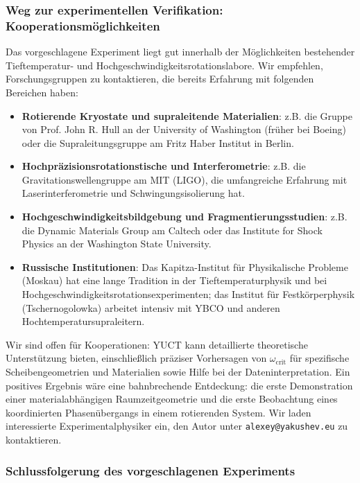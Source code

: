 \documentclass[12pt,a4paper]{article}
\begin{document}
	\subsubsection{Weg zur experimentellen Verifikation: Kooperationsmöglichkeiten}
	
	Das vorgeschlagene Experiment liegt gut innerhalb der Möglichkeiten bestehender Tieftemperatur- und Hochgeschwindigkeitsrotationslabore. Wir empfehlen, Forschungsgruppen zu kontaktieren, die bereits Erfahrung mit folgenden Bereichen haben:
	
	\begin{itemize}
		\item \textbf{Rotierende Kryostate und supraleitende Materialien}: z.B. die Gruppe von Prof. John R. Hull an der University of Washington (früher bei Boeing) oder die Supraleitungsgruppe am Fritz Haber Institut in Berlin.
		\item \textbf{Hochpräzisionsrotationstische und Interferometrie}: z.B. die Gravitationswellengruppe am MIT (LIGO), die umfangreiche Erfahrung mit Laserinterferometrie und Schwingungsisolierung hat.
		\item \textbf{Hochgeschwindigkeitsbildgebung und Fragmentierungsstudien}: z.B. die Dynamic Materials Group am Caltech oder das Institute for Shock Physics an der Washington State University.
		\item \textbf{Russische Institutionen}: Das Kapitza-Institut für Physikalische Probleme (Moskau) hat eine lange Tradition in der Tieftemperaturphysik und bei Hochgeschwindigkeitsrotationsexperimenten; das Institut für Festkörperphysik (Tschernogolowka) arbeitet intensiv mit YBCO und anderen Hochtemperatursupraleitern.
	\end{itemize}
	
	Wir sind offen für Kooperationen: YUCT kann detaillierte theoretische Unterstützung bieten, einschließlich präziser Vorhersagen von \(\omega_{\text{crit}}\) für spezifische Scheibengeometrien und Materialien sowie Hilfe bei der Dateninterpretation. Ein positives Ergebnis wäre eine bahnbrechende Entdeckung: die erste Demonstration einer materialabhängigen Raumzeitgeometrie und die erste Beobachtung eines koordinierten Phasenübergangs in einem rotierenden System. Wir laden interessierte Experimentalphysiker ein, den Autor unter \texttt{alexey@yakushev.eu} zu kontaktieren.
	
	\subsubsection{Schlussfolgerung des vorgeschlagenen Experiments}
	
\end{document}
